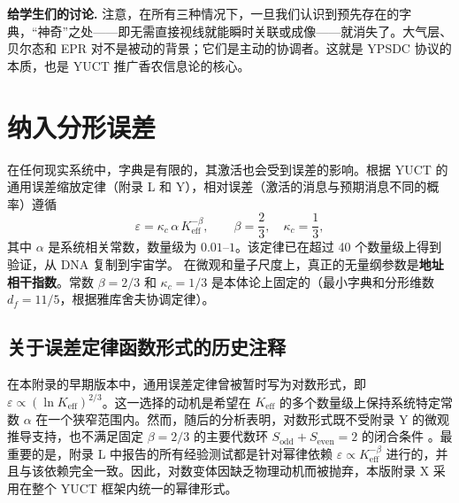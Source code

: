 \documentclass[12pt,a4paper]{article}
\theoremstyle{remark}
\begin{document}
	\vspace{0.2cm}
	\noindent\textbf{给学生们的讨论.} 
	注意，在所有三种情况下，一旦我们认识到预先存在的字典，“神奇”之处——即无需直接视线就能瞬时关联或成像——就消失了。大气层、贝尔态和 EPR 对不是被动的背景；它们是主动的协调者。这就是 YPSDC 协议的本质，也是 YUCT 推广香农信息论的核心。
	
	\section{纳入分形误差}
	\label{sec:errors}
	
	在任何现实系统中，字典是有限的，其激活也会受到误差的影响。根据 YUCT 的通用误差缩放定律（附录 L 和 Y），相对误差（激活的消息与预期消息不同的概率）遵循
	\begin{equation}
		\boxed{\varepsilon = \kappa_c \, \alpha \, K_{\mathrm{eff}}^{-\beta}}, \qquad 
		\beta = \frac{2}{3},\quad \kappa_c = \frac{1}{3},
		\label{eq:error-law-corrected}
	\end{equation}
	其中 $\alpha$ 是系统相关常数，数量级为 $0.01$–$1$。该定律已在超过 40 个数量级上得到验证，从 DNA 复制到宇宙学。  
	在微观和量子尺度上，真正的无量纲参数是\textbf{地址相干指数}。常数 $\beta = 2/3$ 和 $\kappa_c = 1/3$ 是本体论上固定的（最小字典和分形维数 $d_f = 11/5$，根据雅库舍夫协调定律）。
	
	\subsection*{关于误差定律函数形式的历史注释}
	
	在本附录的早期版本中，通用误差定律曾被暂时写为对数形式，即 \( \varepsilon \propto (\ln K_{\mathrm{eff}})^{2/3} \)。这一选择的动机是希望在 \(K_{\mathrm{eff}}\) 的多个数量级上保持系统特定常数 \(\alpha\) 在一个狭窄范围内。然而，随后的分析表明，对数形式既不受附录 Y 的微观推导支持，也不满足固定 \(\beta=2/3\) 的主要代数环 \(S_{\mathrm{odd}}+S_{\mathrm{even}}=2\) 的闭合条件 \cite{YakushevLaw2026}。最重要的是，附录 L 中报告的所有经验测试都是针对幂律依赖 \(\varepsilon \propto K_{\mathrm{eff}}^{-\beta}\) 进行的，并且与该依赖完全一致。因此，对数变体因缺乏物理动机而被抛弃，本版附录 X 采用在整个 YUCT 框架内统一的幂律形式。
	
\end{document}
